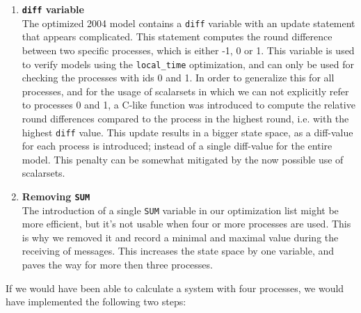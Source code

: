 \documentclass[a4paper,10pt]{article}
\begin{document}
\begin{enumerate}
\item \textbf{\texttt{diff} variable} \\
	The optimized 2004 model contains a \texttt{diff} variable with an update statement that appears complicated. This statement computes the round difference between two specific processes, which is either -1, 0 or 1. This variable is used to verify models using the \texttt{local\_time} optimization, and can only be used for checking the processes with ids 0 and 1. In order to generalize this for all processes, and for the usage of scalarsets in which we can not explicitly refer to processes 0 and 1, a C-like function was introduced to compute the relative round differences compared to the process in the highest round, i.e. with the highest \texttt{diff} value. This update results in a bigger state space, as a diff-value for each process is introduced; instead of a single diff-value for the entire model. This penalty can be somewhat mitigated by the now possible use of scalarsets.

\item \textbf{Removing \texttt{SUM}} \\
	The introduction of a single \texttt{SUM} variable in our optimization list might be more efficient, but it's not usable when four or more processes are used. This is why we removed it and record a minimal and maximal value during the receiving of messages. This increases the state space by one variable, and paves the way for more then three processes.
\end{enumerate}

If we would have been able to calculate a system with four processes, we would have implemented the following two steps:

\end{document}

